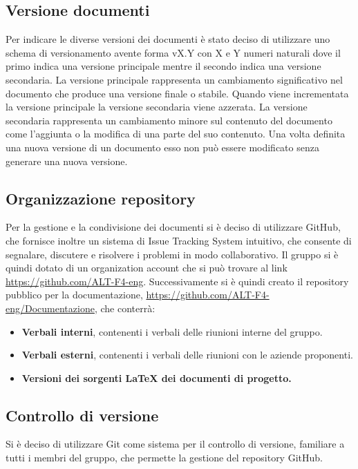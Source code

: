 \documentclass[a4paper, 12pt]{article}
\begin{document}
    \subsection{Versione documenti}
    Per indicare le diverse versioni dei documenti è stato deciso di utilizzare uno schema di versionamento avente forma vX.Y con X e Y numeri naturali dove il primo indica una versione principale mentre il secondo indica una versione secondaria.
    La versione principale rappresenta un cambiamento significativo nel documento che produce una versione finale o stabile.
    Quando viene incrementata la versione principale la versione secondaria viene azzerata.
    La versione secondaria rappresenta un cambiamento minore sul contenuto del documento come l’aggiunta o la modifica di una parte del suo contenuto.
    Una volta definita una nuova versione di un documento esso non può essere modificato senza generare una nuova versione.
    \subsection{Organizzazione repository}
    Per la gestione e la condivisione dei documenti si è deciso di utilizzare GitHub, che fornisce inoltre un sistema di Issue Tracking System  intuitivo, che consente di segnalare, discutere e risolvere i problemi in modo collaborativo.
    Il gruppo si è quindi dotato di un organization account che si può trovare al link \url{https://github.com/ALT-F4-eng}.
    Successivamente si è quindi creato il repository pubblico per la documentazione, \url{https://github.com/ALT-F4-eng/Documentazione}, che conterrà:
    \begin{itemize}
        \item \textbf{Verbali interni}, contenenti i verbali delle riunioni interne del gruppo.
        \item \textbf{Verbali esterni}, contenenti i verbali delle riunioni con le aziende proponenti.
        \item \textbf{Versioni dei sorgenti LaTeX dei documenti di progetto.}
    \end{itemize}
    \subsection{Controllo di versione}
    Si è deciso di utilizzare Git come sistema per il controllo di versione, familiare a tutti i membri del gruppo, che permette la gestione del repository GitHub.
\end{document}

